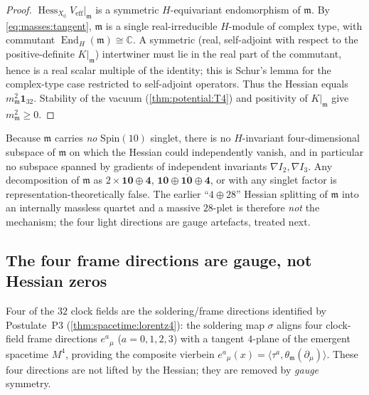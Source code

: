 \begin{proof}
$\operatorname{Hess}_{X_{0}}V_{\mathrm{eff}}|_{\mathfrak m}$ is a symmetric
$H$-equivariant endomorphism of $\mathfrak m$. By \eqref{eq:masses:tangent},
$\mathfrak m$ is a single real-irreducible $H$-module of complex type, with
commutant $\operatorname{End}_{H}(\mathfrak m)\cong\mathbb C$. A symmetric (real,
self-adjoint with respect to the positive-definite $K|_{\mathfrak m}$)
intertwiner must lie in the real part of the commutant, hence is a real scalar
multiple of the identity; this is Schur's lemma for the complex-type case
restricted to self-adjoint operators. Thus the Hessian equals
$m_{\mathfrak m}^{2}\mathbf 1_{32}$. Stability of the vacuum
(\autoref{thm:potential:T4}) and positivity of $K|_{\mathfrak m}$ give
$m_{\mathfrak m}^{2}\ge 0$.
\end{proof}

\begin{remark}\label{rmk:masses:nosinglet}
Because $\mathfrak m$ carries \emph{no} $\mathrm{Spin}(10)$ singlet, there is no
$H$-invariant four-dimensional subspace of $\mathfrak m$ on which the Hessian
could independently vanish, and in particular no subspace spanned by gradients
of independent invariants $\nabla I_{2},\nabla I_{3}$. Any decomposition of
$\mathfrak m$ as $2\times\mathbf{10}\oplus\mathbf 4$, $\mathbf{10}\oplus
\overline{\mathbf{10}}\oplus\mathbf 4$, or with any singlet factor is
representation-theoretically false. The earlier ``$4\oplus 28$'' Hessian
splitting of $\mathfrak m$ into an internally massless quartet and a massive
$28$-plet is therefore \emph{not} the mechanism; the four light directions are
gauge artefacts, treated next.
\end{remark}

\subsection{The four frame directions are gauge, not Hessian zeros}
\label{sec:masses:frame}

Four of the $32$ clock fields are the soldering/frame directions identified by
Postulate~P3 (\autoref{thm:spacetime:lorentz4}): the soldering map $\sigma$ aligns four
clock-field frame directions $e^{a}{}_{\mu}$ ($a=0,1,2,3$) with a tangent
$4$-plane of the emergent spacetime $M^{4}$, providing the composite vierbein
$e^{a}{}_{\mu}(x)=\langle\tau^{a},\theta_{\mathfrak m}(\partial_{\mu})\rangle$.
These four directions are not lifted by the Hessian; they are removed by
\emph{gauge} symmetry.

